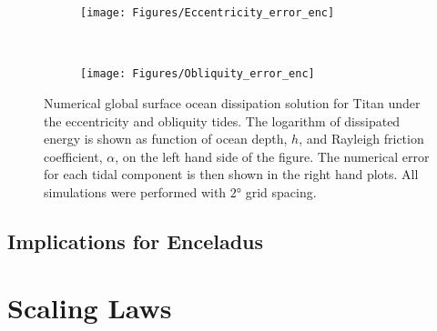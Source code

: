 \begin{figure}[!t]
\centering
\begin{subfigure}{0.9\linewidth}
\centering
\texttt{[image: Figures/Eccentricity\_error\_enc]}
\subcaption{\label{fig:lincEccEncel}}
\end{subfigure}\\\vspace*{-0.5cm}
\begin{subfigure}{0.9\linewidth}
\centering
\texttt{[image: Figures/Obliquity\_error\_enc]}
\subcaption{\label{fig:linObliqEncel}}
\end{subfigure}
\vspace*{-0.8cm}
\caption{Numerical global surface ocean dissipation solution for Titan under the eccentricity and obliquity tides. The logarithm of dissipated energy is shown as function of ocean depth, $h$, and Rayleigh friction coefficient, $\alpha$, on the left hand side of the figure. The numerical error for each tidal component is then shown in the right hand plots. All simulations were performed with $\ang{2}$ grid spacing. \label{fig:linEncel}}
\end{figure}

\subsection{Implications for Enceladus}

\section{Scaling Laws \label{subsec:scaling}}